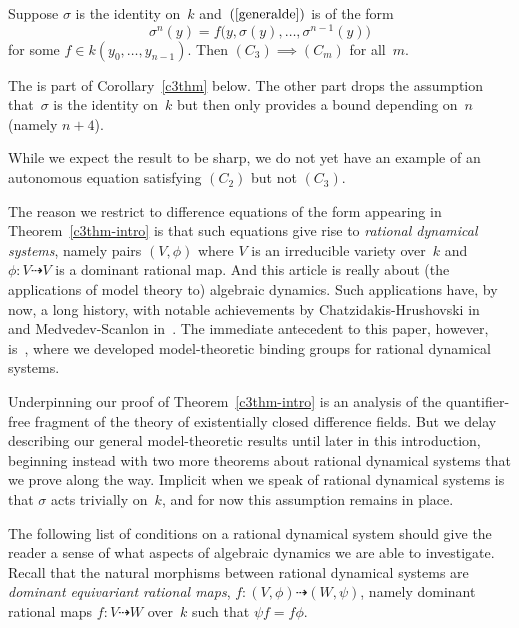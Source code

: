 \documentclass[\DocOpts]{amsart}
\theoremstyle{definition}
\newenvironment{customthm}[1]
  {\renewcommand\theinnercustomthm{#1}\innercustomthm}
  {\endinnercustomthm}
\newcommand{\<}{\langle}
\renewcommand{\>}{\rangle}
\newcommand{\dto}{\dashrightarrow}
\begin{document}
\begin{customthm}{1}
\label{c3thm-intro}
Suppose $\sigma$ is the identity on~$k$ and~$(\ref{generalde})$ is of the form 
$$\displaystyle \sigma^n(y)=f\big(y, \sigma(y),\dots,\sigma^{n-1}(y)\big)
$$
for some $f\in k(y_0,\dots,y_{n-1})$.
Then $(C_3)\implies(C_m)$ for all~$m$.
\end{customthm}

The is part of Corollary~\ref{c3thm} below.
The other part drops the assumption that~$\sigma$ is the identity on~$k$ but then only provides a bound depending on~$n$ (namely $n+4$).

While we expect the result to be sharp, we do not yet have an example of an autonomous equation satisfying $(C_2)$ but not $(C_3)$.

The reason we restrict to difference equations of the form appearing in Theorem~\ref{c3thm-intro} is that such equations give rise to {\em rational dynamical systems}, namely pairs $(V,\phi)$ where $V$ is an irreducible variety over~$k$ and $\phi:V\dto V$ is a dominant rational map.
And this article is really about (the applications of model theory to) algebraic dynamics.
Such applications have, by now, a long history, with notable achievements by Chatzidakis-Hrushovski in~\cite{acfa, ch1, ch2} and Medvedev-Scanlon in~\cite{alicetom}.
The immediate antecedent to this paper, however, is~\cite{qfint}, where we developed model-theoretic binding groups for rational dynamical systems.

Underpinning our proof of Theorem~\ref{c3thm-intro} is an analysis of the quantifier-free fragment of  the theory of existentially closed difference fields.
But we delay describing our general model-theoretic results until later in this introduction, beginning instead with two more theorems about rational dynamical systems that we prove along the way.
Implicit when we speak of rational dynamical systems is that $\sigma$ acts trivially on~$k$, and for now this assumption remains in place.

The following list of conditions on a rational dynamical system should give the reader a sense of what aspects of algebraic dynamics we are able to investigate.
Recall that the natural morphisms between rational dynamical systems are {\em dominant equivariant rational maps}, $f:(V,\phi)\dto(W,\psi)$, namely dominant rational maps $f:V\dto W$ over~$k$ such that $\psi f=f\phi$.
\end{document}
